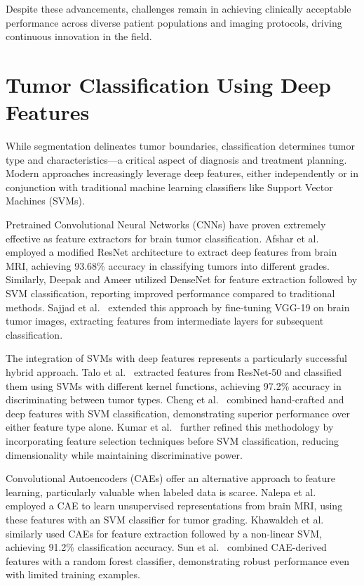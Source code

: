 Despite these advancements, challenges remain in achieving clinically acceptable performance across diverse patient populations and imaging protocols, driving continuous innovation in the field.

\section{Tumor Classification Using Deep Features}

While segmentation delineates tumor boundaries, classification determines tumor type and characteristics—a critical aspect of diagnosis and treatment planning. Modern approaches increasingly leverage deep features, either independently or in conjunction with traditional machine learning classifiers like Support Vector Machines (SVMs).

Pretrained Convolutional Neural Networks (CNNs) have proven extremely effective as feature extractors for brain tumor classification. Afshar et al.\ \cite{Afshar2019} employed a modified ResNet architecture to extract deep features from brain MRI, achieving 93.68\% accuracy in classifying tumors into different grades. Similarly, Deepak and Ameer \cite{Deepak2019} utilized DenseNet for feature extraction followed by SVM classification, reporting improved performance compared to traditional methods. Sajjad et al.\ \cite{Sajjad2019} extended this approach by fine-tuning VGG-19 on brain tumor images, extracting features from intermediate layers for subsequent classification.

The integration of SVMs with deep features represents a particularly successful hybrid approach. Talo et al.\ \cite{Talo2019} extracted features from ResNet-50 and classified them using SVMs with different kernel functions, achieving 97.2\% accuracy in discriminating between tumor types. Cheng et al.\ \cite{Cheng2015} combined hand-crafted and deep features with SVM classification, demonstrating superior performance over either feature type alone. Kumar et al.\ \cite{Kumar2019} further refined this methodology by incorporating feature selection techniques before SVM classification, reducing dimensionality while maintaining discriminative power.

Convolutional Autoencoders (CAEs) offer an alternative approach to feature learning, particularly valuable when labeled data is scarce. Nalepa et al.\ \cite{Nalepa2019} employed a CAE to learn unsupervised representations from brain MRI, using these features with an SVM classifier for tumor grading. Khawaldeh et al.\ \cite{Khawaldeh2018} similarly used CAEs for feature extraction followed by a non-linear SVM, achieving 91.2\% classification accuracy. Sun et al.\ \cite{Sun2018} combined CAE-derived features with a random forest classifier, demonstrating robust performance even with limited training examples.

